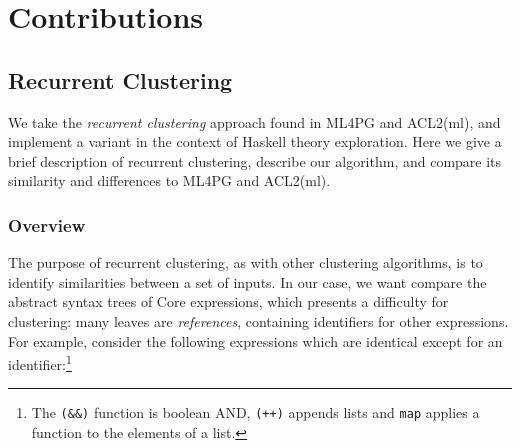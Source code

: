 \section{Contributions}
\label{sec:contributions}

\subsection{Recurrent Clustering}
\label{sec:recurrentclustering}

We take the \emph{recurrent clustering} approach found in ML4PG and ACL2(ml), and implement a variant in the context of Haskell theory exploration. Here we give a brief description of recurrent clustering, describe our algorithm, and compare its similarity and differences to ML4PG and ACL2(ml).

\subsubsection{Overview}

\iffalse TODO: Much of this discussion reads as a minor implementation solution rather than an overview of the whole method \fi

\iffalse TODO: Don't show the ``pkg:Mod:name'' format here, it will just be confusing. Leave that to the implementation section. \fi

\iffalse TODO: Focus the section more on the problem of identifiers, and how recurrent clustering uses clustering as part of feature extraction to solve this \fi

\iffalse TODO: Maybe present the translation from trees to matrices, to vectors first; leaving the conversion of terms to features until afterwards; similar to how ML4PG uses [foo] to mean ``the feature corresponding to foo, whatever that might be'' \fi

\iffalse TODO: Maybe present recurrent clustering in a ``naive'' way: define the conversion function ``[]'' recursively. Leave the dependency-ordering, etc. for the Algorithm section, as a way of ``building up to'' the result, which avoids the inefficiencies of recursing. \fi

The purpose of recurrent clustering, as with other clustering algorithms, is to identify similarities between a set of inputs. In our case, we want compare the abstract syntax trees of Core expressions, which presents a difficulty for clustering: many leaves are \emph{references}, containing identifiers for other expressions. For example, consider the following expressions which are identical except for an identifier:\footnote{The \texttt{(\&\&)} function is boolean AND, \texttt{(++)} appends lists and \texttt{map} applies a function to the elements of a list.}

